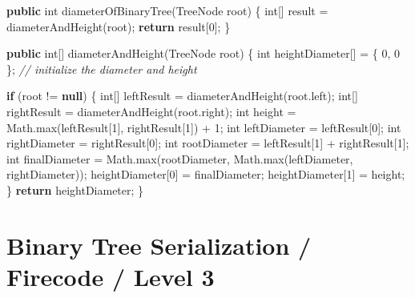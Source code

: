 \documentclass[]{book}
\newenvironment{Shaded}{\begin{snugshade}}{\end{snugshade}}
\newcommand{\BuiltInTok}[1]{#1}
\newcommand{\CommentTok}[1]{\textcolor[rgb]{0.56,0.35,0.01}{\textit{#1}}}
\newcommand{\DataTypeTok}[1]{\textcolor[rgb]{0.13,0.29,0.53}{#1}}
\newcommand{\DecValTok}[1]{\textcolor[rgb]{0.00,0.00,0.81}{#1}}
\newcommand{\FunctionTok}[1]{\textcolor[rgb]{0.00,0.00,0.00}{#1}}
\newcommand{\KeywordTok}[1]{\textcolor[rgb]{0.13,0.29,0.53}{\textbf{#1}}}
\newcommand{\NormalTok}[1]{#1}
\begin{document}
\begin{Shaded}
\begin{Highlighting}[]
\KeywordTok{public} \DataTypeTok{int} \FunctionTok{diameterOfBinaryTree}\NormalTok{(}\BuiltInTok{TreeNode}\NormalTok{ root) \{}
    \DataTypeTok{int}\NormalTok{[] result = }\FunctionTok{diameterAndHeight}\NormalTok{(root);}
    \KeywordTok{return}\NormalTok{ result[}\DecValTok{0}\NormalTok{];}
\NormalTok{\}}

\KeywordTok{public} \DataTypeTok{int}\NormalTok{[] }\FunctionTok{diameterAndHeight}\NormalTok{(}\BuiltInTok{TreeNode}\NormalTok{ root) \{}
    \DataTypeTok{int}\NormalTok{ heightDiameter[] = \{ }\DecValTok{0}\NormalTok{, }\DecValTok{0}\NormalTok{ \};          }\CommentTok{// initialize the diameter and height}

    \KeywordTok{if}\NormalTok{ (root != }\KeywordTok{null}\NormalTok{) \{}
        \DataTypeTok{int}\NormalTok{[] leftResult = }\FunctionTok{diameterAndHeight}\NormalTok{(root.}\FunctionTok{left}\NormalTok{);}
        \DataTypeTok{int}\NormalTok{[] rightResult = }\FunctionTok{diameterAndHeight}\NormalTok{(root.}\FunctionTok{right}\NormalTok{);}
        \DataTypeTok{int}\NormalTok{ height = }\BuiltInTok{Math}\NormalTok{.}\FunctionTok{max}\NormalTok{(leftResult[}\DecValTok{1}\NormalTok{], rightResult[}\DecValTok{1}\NormalTok{]) + }\DecValTok{1}\NormalTok{;}
        \DataTypeTok{int}\NormalTok{ leftDiameter = leftResult[}\DecValTok{0}\NormalTok{];}
        \DataTypeTok{int}\NormalTok{ rightDiameter = rightResult[}\DecValTok{0}\NormalTok{];}
        \DataTypeTok{int}\NormalTok{ rootDiameter = leftResult[}\DecValTok{1}\NormalTok{] + rightResult[}\DecValTok{1}\NormalTok{];}
        \DataTypeTok{int}\NormalTok{ finalDiameter = }\BuiltInTok{Math}\NormalTok{.}\FunctionTok{max}\NormalTok{(rootDiameter, }\BuiltInTok{Math}\NormalTok{.}\FunctionTok{max}\NormalTok{(leftDiameter, rightDiameter));}
\NormalTok{        heightDiameter[}\DecValTok{0}\NormalTok{] = finalDiameter;}
\NormalTok{        heightDiameter[}\DecValTok{1}\NormalTok{] = height;}
\NormalTok{    \}}
    \KeywordTok{return}\NormalTok{ heightDiameter;}
\NormalTok{\}}
\end{Highlighting}
\end{Shaded}

\hypertarget{binary-tree-serialization-firecode-level-3}{%
\section{Binary Tree Serialization / Firecode / Level 3}\label{binary-tree-serialization-firecode-level-3}}
\end{document}
